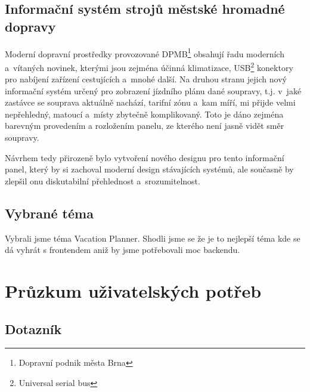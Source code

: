 \documentclass{article}
\begin{document}
\subsection{Informační systém strojů městské hromadné dopravy}
Moderní dopravní prostředky provozované DPMB\footnote{Dopravní podnik města Brna}
obsahují řadu moderních a~vítaných novinek, kterými jsou zejména účinná klimatizace,
USB\footnote{Universal serial bus} konektory pro nabíjení zařízení cestujících a~mnohé
další. Na druhou stranu jejich nový informační systém určený pro zobrazení
jízdního plánu dané soupravy, t.j. v~jaké zastávce se souprava aktuálně nachází,
tarifní zónu a~kam míří, mi přijde velmi nepřehledný, matoucí a~místy zbytečně komplikovaný.
Toto je dáno zejména barevným provedením a rozložením panelu, ze kterého není jasně
vidět směr soupravy.

Návrhem tedy přirozeně bylo vytvoření nového designu pro tento informační panel, který by si
zachoval moderní design stávajících systémů, ale současně by zlepšil onu diskutabilní
přehlednost a~srozumitelnost.

\subsection{Vybrané téma}
Vybrali jsme téma Vacation Planner. Shodli jsme se že je to nejlepší téma kde
se dá vyhrát s frontendem aniž by jsme potřebovali moc backendu.

\section{Průzkum uživatelských potřeb}

\subsection{Dotazník}
\end{document}
